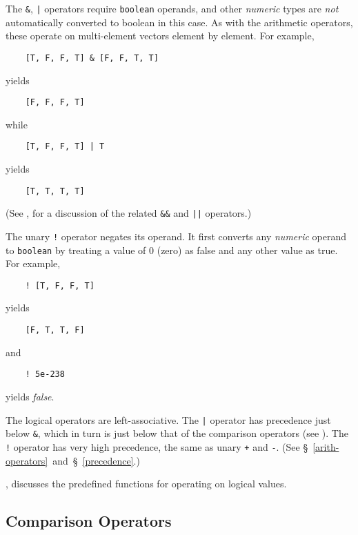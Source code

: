 The {\tt \&}, \verb+|+ operators require
{\tt boolean} operands, and other {\em numeric} types are {\em not}
automatically converted to boolean in this case.  As with the arithmetic
operators, these operate on multi-element vectors element by element.
For example,
\begin{verbatim}
    [T, F, F, T] & [F, F, T, T]
\end{verbatim}
yields
\begin{verbatim}
    [F, F, F, T]
\end{verbatim}
while
\begin{verbatim}
    [T, F, F, T] | T
\end{verbatim}
yields
\begin{verbatim}
    [T, T, T, T]
\end{verbatim}
(See , for a discussion of the related {\tt \&\&}
and \verb+||+ operators.)

The unary {\tt !} operator negates its operand.  It first  converts any
{\em numeric} operand to {\tt boolean} by treating a value of 0 (zero) as
false and any other value as true.
For example,
\begin{verbatim}
    ! [T, F, F, T]
\end{verbatim}
yields
\begin{verbatim}
    [F, T, T, F]
\end{verbatim}
and
\begin{verbatim}
    ! 5e-238
\end{verbatim}
yields {\em false}.

The logical operators are left-associative.
The 
\verb+|+ operator has
precedence just below {\tt \&}, which in turn is just below that of
the comparison operators (see ).  The {\tt !}
operator has very high precedence, the same as unary {\tt +} and {\tt -}.
(See \S~\ref{arith-operators}~and~\S~\ref{precedence}.)

, discusses the predefined functions
for operating on logical values.

\subsection{Comparison Operators}
\label{rel-operators}

